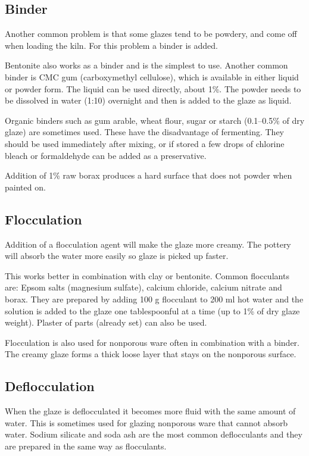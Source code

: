 \subsection{Binder}
Another common problem is that some glazes tend to be powdery, and come off 
when loading the kiln. For this problem a binder is added.

Bentonite also works as a binder and is the simplest to use. Another common 
binder is CMC gum (carboxymethyl cellulose), which is available in either 
liquid or powder form. The liquid can be used directly, about 1\%. The powder 
needs to be dissolved in water (1:10) overnight and then is added to the glaze 
as liquid.

Organic binders such as gum arable, wheat flour, sugar or starch (0.1--0.5\% of 
dry glaze) are sometimes used. These have the disadvantage of fermenting. They 
should be used immediately after mixing, or if stored a few drops of chlorine 
bleach or formaldehyde can be added as a preservative.

Addition of 1\% raw borax produces a hard surface that does not powder when 
painted on.
\subsection{Flocculation}
Addition of a flocculation agent will make the glaze more creamy. The pottery 
will absorb the water more easily so glaze is picked up faster.

This works better in combination with clay or bentonite. Common flocculants 
are: Epsom salts (magnesium sulfate), calcium chloride, calcium nitrate and 
borax. They are prepared by adding 100 g flocculant to 200 ml hot water and the 
solution is added to the glaze one tablespoonful at a time (up to 1\% of dry 
glaze weight). Plaster of parts (already set) can also be used.

Flocculation is also used for nonporous ware often in combination with a 
binder. The creamy glaze forms a thick loose layer that stays on the nonporous 
surface.
\subsection{Deflocculation}
When the glaze is deflocculated it becomes more fluid with the same amount of 
water. This is sometimes used for glazing nonporous ware that cannot absorb 
water. Sodium silicate and soda ash are the most common deflocculants and they 
are prepared in the same way as flocculants.

